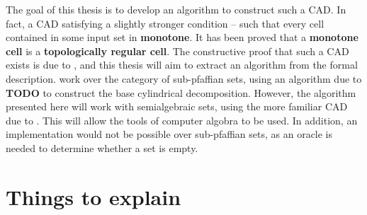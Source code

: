 \documentclass[
]{book}
\theoremstyle{definition}
\theoremstyle{definition}
\theoremstyle{definition}
\theoremstyle{definition}
\theoremstyle{remark}
\begin{document}
The goal of this thesis is to develop an algorithm to construct such a CAD. In fact, a CAD satisfying a slightly stronger condition -- such that every cell contained in some input set in \textbf{monotone}. It has been proved that a \textbf{monotone cell} is a \textbf{topologically regular cell}. The constructive proof that such a CAD exists is due to \citep{bgv15}, and this thesis will aim to extract an algorithm from the formal description.
\citep{bgv15} work over the category of sub-pfaffian sets, using an algorithm due to \textbf{TODO} to construct the base
cylindrical decomposition. However, the algorithm presented here will work with semialgebraic sets, using the more
familiar CAD due to \citep{collins1975}. This will allow the tools of computer algobra to be used. In addition, an implementation would not be possible over sub-pfaffian sets, as an oracle is needed to determine whether a set is empty.

\hypertarget{things-to-explain}{%
\section{Things to explain}\label{things-to-explain}}
\end{document}
